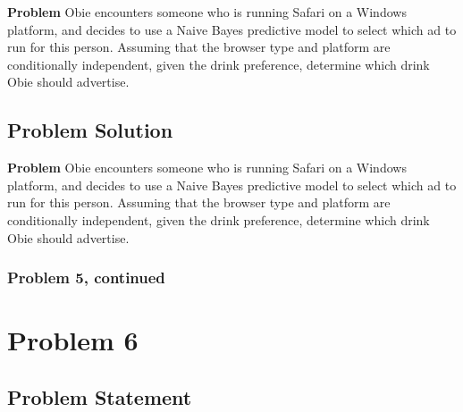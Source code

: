 \documentclass[12pt]{article}
\theoremstyle{definition}
\begin{document}
\bigskip
\noindent
{\bf Problem} Obie encounters someone who is running Safari on a Windows platform, and decides to use a Naive Bayes predictive model to select which ad to run for this person. Assuming that the browser type and platform are conditionally independent, given the drink preference, determine which drink Obie should advertise.


\newpage
\subsection*{Problem Solution}

\noindent
{\bf Problem} Obie encounters someone who is running Safari on a Windows platform, and decides to use a Naive Bayes predictive model to select which ad to run for this person. Assuming that the browser type and platform are conditionally independent, given the drink preference, determine which drink Obie should advertise.

\newpage
\subsubsection*{Problem 5, continued}



\newpage
\section*{Problem 6}


\subsection*{Problem Statement}
\end{document}
